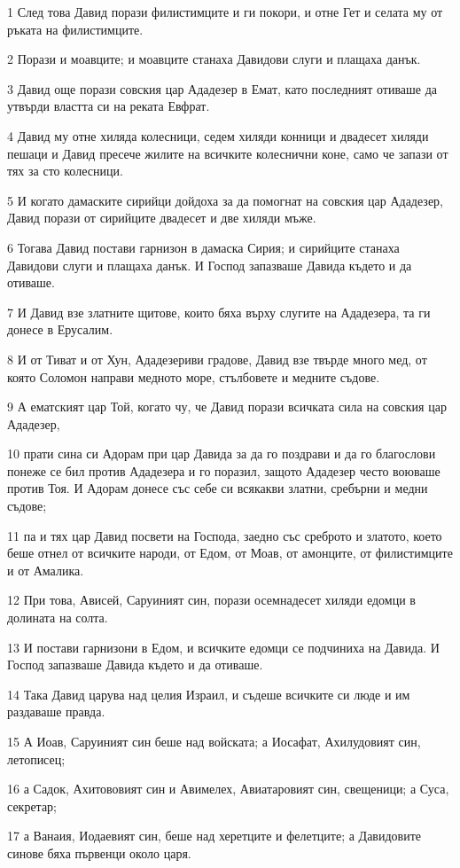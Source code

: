 \par 1 След това Давид порази филистимците и ги покори, и отне Гет и селата му от ръката на филистимците.
\par 2 Порази и моавците; и моавците станаха Давидови слуги и плащаха данък.
\par 3 Давид още порази совския цар Ададезер в Емат, като последният отиваше да утвърди властта си на реката Евфрат.
\par 4 Давид му отне хиляда колесници, седем хиляди конници и двадесет хиляди пешаци и Давид пресече жилите на всичките колеснични коне, само че запази от тях за сто колесници.
\par 5 И когато дамаските сирийци дойдоха за да помогнат на совския цар Ададезер, Давид порази от сирийците двадесет и две хиляди мъже.
\par 6 Тогава Давид постави гарнизон в дамаска Сирия; и сирийците станаха Давидови слуги и плащаха данък. И Господ запазваше Давида където и да отиваше.
\par 7 И Давид взе златните щитове, които бяха върху слугите на Ададезера, та ги донесе в Ерусалим.
\par 8 И от Тиват и от Хун, Ададезериви градове, Давид взе твърде много мед, от която Соломон направи медното море, стълбовете и медните съдове.
\par 9 А ематският цар Той, когато чу, че Давид порази всичката сила на совския цар Ададезер,
\par 10 прати сина си Адорам при цар Давида за да го поздрави и да го благослови понеже се бил против Ададезера и го поразил, защото Ададезер често воюваше против Тоя. И Адорам донесе със себе си всякакви златни, сребърни и медни съдове;
\par 11 па и тях цар Давид посвети на Господа, заедно със среброто и златото, което беше отнел от всичките народи, от Едом, от Моав, от амонците, от филистимците и от Амалика.
\par 12 При това, Ависей, Саруиният син, порази осемнадесет хиляди едомци в долината на солта.
\par 13 И постави гарнизони в Едом, и всичките едомци се подчиниха на Давида. И Господ запазваше Давида където и да отиваше.
\par 14 Така Давид царува над целия Израил, и съдеше всичките си люде и им раздаваше правда.
\par 15 А Иоав, Саруиният син беше над войската; а Иосафат, Ахилудовият син, летописец;
\par 16 а Садок, Ахитововият син и Авимелех, Авиатаровият син, свещеници; а Суса, секретар;
\par 17 а Ванаия, Иодаевият син, беше над херетците и фелетците; а Давидовите синове бяха първенци около царя.

